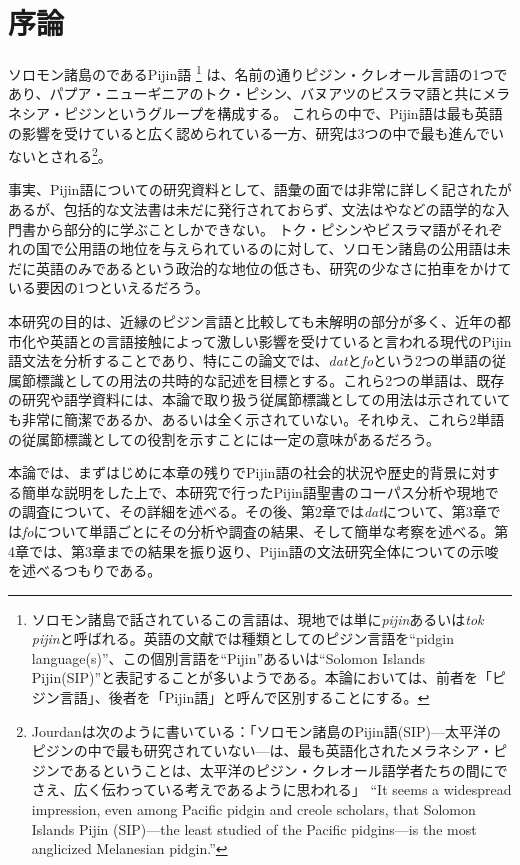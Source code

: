 \chapter{序論}

ソロモン諸島のであるPijin語
\footnote{ソロモン諸島で話されているこの言語は、現地では単に\textit{pijin}あるいは\textit{tok pijin}と呼ばれる。英語の文献では種類としてのピジン言語を``pidgin language(s)''、この個別言語を``Pijin''あるいは``Solomon Islands Pijin(SIP)''と表記することが多いようである。本論においては、前者を「ピジン言語」、後者を「Pijin語」と呼んで区別することにする。}
は、名前の通りピジン・クレオール言語の1つであり、パプア・ニューギニアのトク・ピシン、バヌアツのビスラマ語と共にメラネシア・ピジンというグループを構成する。
これらの中で、Pijin語は最も英語の影響を受けていると広く認められている一方、研究は3つの中で最も進んでいないとされる\footnote{
  Jourdanは次のように書いている：「ソロモン諸島のPijin語(SIP)---太平洋のピジンの中で最も研究されていない---は、最も英語化されたメラネシア・ピジンであるということは、太平洋のピジン・クレオール語学者たちの間にでさえ、広く伝わっている考えであるように思われる」
  ``It seems a widespread impression, even among Pacific pidgin and creole scholars, that Solomon Islands Pijin (SIP)---the least studied of the Pacific pidgins---is the most anglicized Melanesian pidgin.''\citep{nativization}
}\citep{nativization}。

事実、Pijin語についての研究資料として、語彙の面では非常に詳しく記された\cite{dictionary}があるが、包括的な文法書は未だに発行されておらず\citep{phonology}、文法は\cite{yumi}や\cite{eric}などの語学的な入門書から部分的に学ぶことしかできない。
トク・ピシンやビスラマ語がそれぞれの国で公用語の地位を与えられているのに対して、ソロモン諸島の公用語は未だに英語のみであるという政治的な地位の低さも、研究の少なさに拍車をかけている要因の1つといえるだろう。

本研究の目的は、近縁のピジン言語と比較しても未解明の部分が多く、近年の都市化や英語との言語接触によって激しい影響を受けていると言われる現代のPijin語文法を分析することであり、特にこの論文では、\textit{dat}と\textit{fo}という2つの単語の従属節標識としての用法の共時的な記述を目標とする。これら2つの単語は、既存の研究や語学資料には、本論で取り扱う従属節標識としての用法は示されていても非常に簡潔であるか、あるいは全く示されていない。それゆえ、これら2単語の従属節標識としての役割を示すことには一定の意味があるだろう。

本論では、まずはじめに本章の残りでPijin語の社会的状況や歴史的背景に対する簡単な説明をした上で、本研究で行ったPijin語聖書のコーパス分析や現地での調査について、その詳細を述べる。その後、第2章では\textit{dat}について、第3章では\textit{fo}について単語ごとにその分析や調査の結果、そして簡単な考察を述べる。第4章では、第3章までの結果を振り返り、Pijin語の文法研究全体についての示唆を述べるつもりである。

